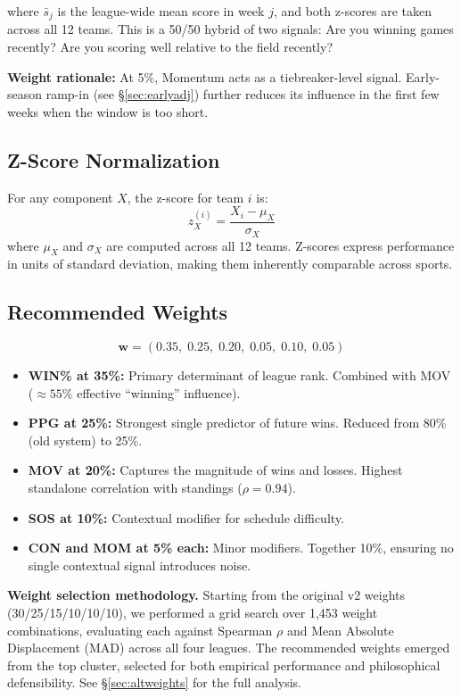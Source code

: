 \documentclass[11pt,a4paper]{article}
\begin{document}
where $\bar{s}_j$ is the league-wide mean score in week $j$, and both z-scores are taken across all 12 teams. This is a 50/50 hybrid of two signals: Are you winning games recently? Are you scoring well relative to the field recently?

\textbf{Weight rationale:} At 5\%, Momentum acts as a tiebreaker-level signal. Early-season ramp-in (see \S\ref{sec:earlyadj}) further reduces its influence in the first few weeks when the window is too short.

\subsection{Z-Score Normalization}

For any component $X$, the z-score for team $i$ is:
\[
z^{(i)}_X = \frac{X_i - \mu_X}{\sigma_X}
\]
where $\mu_X$ and $\sigma_X$ are computed across all 12 teams. Z-scores express performance in units of standard deviation, making them inherently comparable across sports.

\subsection{Recommended Weights}
\[
\mathbf{w} = (0.35,\; 0.25,\; 0.20,\; 0.05,\; 0.10,\; 0.05)
\]

\begin{itemize}[nosep]
\item \textbf{WIN\% at 35\%:} Primary determinant of league rank. Combined with MOV ($\approx 55\%$ effective ``winning'' influence).
\item \textbf{PPG at 25\%:} Strongest single predictor of future wins. Reduced from 80\% (old system) to 25\%.
\item \textbf{MOV at 20\%:} Captures the magnitude of wins and losses. Highest standalone correlation with standings ($\rho = 0.94$).
\item \textbf{SOS at 10\%:} Contextual modifier for schedule difficulty.
\item \textbf{CON and MOM at 5\% each:} Minor modifiers. Together 10\%, ensuring no single contextual signal introduces noise.
\end{itemize}

\textbf{Weight selection methodology.} Starting from the original v2 weights (30/25/15/10/10/10), we performed a grid search over 1,453 weight combinations, evaluating each against Spearman $\rho$ and Mean Absolute Displacement (MAD) across all four leagues. The recommended weights emerged from the top cluster, selected for both empirical performance and philosophical defensibility. See \S\ref{sec:altweights} for the full analysis.
\end{document}
